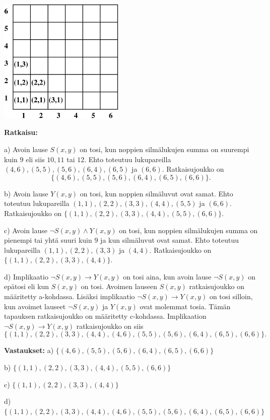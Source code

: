 \begin{center}
\includegraphics[width=6cm]{kuvat/6x6}
\end{center}

{\bf Ratkaisu:}

a) Avoin lause $S(x,y)$ on tosi, kun noppien silmälukujen summa on suurempi kuin $9$ eli siis $10, 11$ tai $12$. Ehto toteutuu lukupareilla $(4, 6), (5, 5), (5, 6), (6, 4), (6, 5)$ ja $(6, 6)$. Ratkaisujoukko on
\[
\{(4, 6), (5, 5), (5, 6), (6, 4), (6, 5), (6, 6)\}.
\]

b) Avoin lause $Y(x,y)$ on tosi, kun noppien silmäluvut ovat samat. Ehto toteutuu lukupareilla $(1, 1), (2, 2), (3, 3), (4, 4), (5, 5)$ ja $(6, 6)$. Ratkaisujoukko on $\{(1, 1), (2, 2), (3, 3), (4, 4), (5, 5), (6, 6)\}$.

c) Avoin lause $\lnot S(x,y) \land Y(x,y)$ on tosi, kun noppien silmälukujen summa on pienempi tai yhtä suuri kuin $9$ ja kun silmäluvut ovat samat. Ehto toteutuu lukupareilla $(1,1), (2, 2), (3, 3)$ ja $(4, 4)$. Ratkaisujoukko on $\{(1,1), (2, 2), (3, 3), (4, 4)\}$.


d) Implikaatio $\lnot S(x,y) \to Y(x,y)$ on tosi aina, kun avoin lause $\lnot S(x,y)$ on epätosi eli kun $S(x,y)$ on tosi. Avoimen lauseen $S(x,y)$ ratkaisujoukko on määritetty a-kohdassa. Lisäksi implikaatio $\lnot S(x,y) \to Y(x,y)$ on tosi silloin, kun avoimet lauseet $\lnot S(x,y)$ ja $Y(x,y)$ ovat molemmat tosia. Tämän tapauksen ratkaisujoukko on määritetty c-kohdassa. Implikaation $\lnot S(x,y) \to Y(x,y)$ ratkaisujoukko on siis
\[
\{(1,1), (2, 2), (3, 3), (4, 4), (4, 6), (5, 5), (5, 6), (6, 4), (6, 5), (6, 6)\}.
\]

{\bf Vastaukset:} a) $\{(4, 6), (5, 5), (5, 6), (6, 4), (6, 5), (6, 6)\}$

b) $\{(1, 1), (2, 2), (3, 3), (4, 4), (5, 5), (6, 6)\}$

c) $\{(1,1), (2, 2), (3, 3), (4, 4)\}$

d) $\{(1,1), (2, 2), (3, 3), (4, 4), (4, 6), (5, 5), (5, 6), (6, 4), (6, 5), (6, 6)\}$


